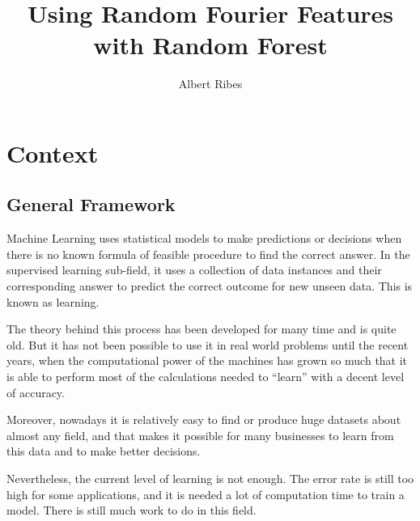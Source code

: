\documentclass{article}
\title{Using Random Fourier Features with Random Forest}
\author{Albert Ribes}
\begin{document}
\maketitle
\tableofcontents
\newpage

\section{Context}
    \subsection{General Framework}

    Machine Learning uses statistical models to make predictions or decisions
    when there is no known formula of feasible procedure to find the correct
    answer. In the supervised learning sub-field, it uses a collection of
    data instances and their corresponding answer to predict
    the correct outcome for new unseen data. This is known as learning.

    The theory behind this process has been developed for many time and is quite
    old. But it has not been possible to use it in real world problems until the
    recent years, when the computational power of the machines has grown so much
    that it is able to perform most of the calculations needed to ``learn'' with
    a decent level of accuracy.

    Moreover, nowadays it is relatively easy to find or produce huge datasets
    about almost any field, and that makes it possible for many businesses to learn
    from this data and to make better decisions.

    Nevertheless, the current level of learning is not enough. The error rate is still too high for some applications, and it is needed a lot of
    computation time to train a model. There is still much work to do in
    this field.
\end{document}
